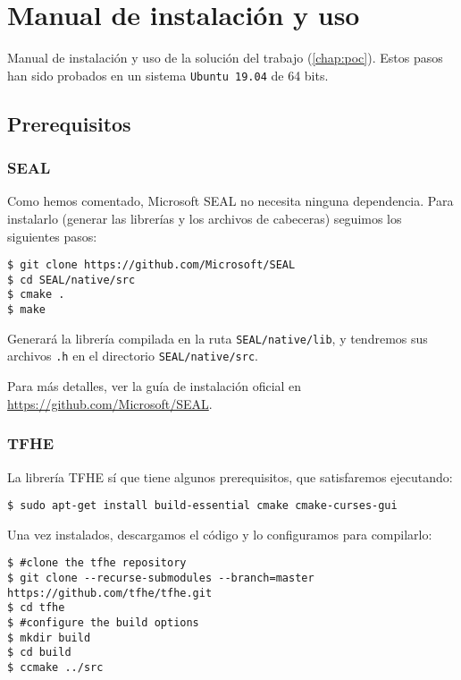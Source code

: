 \chapter{Manual de instalación y uso}
\label{appendix:manual}

Manual de instalación y uso de la solución del trabajo (\ref{chap:poc}). Estos pasos han sido probados en un sistema \verb|Ubuntu 19.04| de 64 bits.

\section{Prerequisitos}

\subsection{SEAL}

Como hemos comentado, Microsoft SEAL no necesita ninguna dependencia. Para instalarlo (generar las librerías y los archivos de cabeceras) seguimos los siguientes pasos:

\begin{verbatim}
$ git clone https://github.com/Microsoft/SEAL
$ cd SEAL/native/src
$ cmake .
$ make
\end{verbatim}

Generará la librería compilada en la ruta \verb|SEAL/native/lib|, y tendremos sus archivos \verb|.h| en el directorio \verb|SEAL/native/src|.

Para más detalles, ver la guía de instalación oficial en \url{https://github.com/Microsoft/SEAL}.

\subsection{TFHE}

La librería TFHE sí que tiene algunos prerequisitos, que satisfaremos ejecutando:

\begin{verbatim}
$ sudo apt-get install build-essential cmake cmake-curses-gui
\end{verbatim}

Una vez instalados, descargamos el código y lo configuramos para compilarlo:

\begin{verbatim}
$ #clone the tfhe repository
$ git clone --recurse-submodules --branch=master https://github.com/tfhe/tfhe.git
$ cd tfhe
$ #configure the build options
$ mkdir build
$ cd build
$ ccmake ../src
\end{verbatim}

